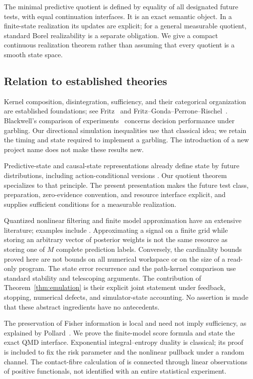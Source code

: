 The minimal predictive quotient is defined by equality of all designated
future tests, with equal continuation interfaces. It is an exact semantic
object. In a finite-state realization its updates are explicit; for a
general measurable quotient, standard Borel realizability is a separate
obligation. We give a compact continuous realization theorem rather than
assuming that every quotient is a smooth state space.

\subsection{Relation to established theories}
Kernel composition, disintegration, sufficiency, and their categorical
organization are established foundations; see Fritz~\cite{Fritz2020} and
Fritz--Gonda--Perrone--Rischel~\cite{FGPR2023}. Blackwell's comparison
of experiments~\cite{Blackwell1953} concerns decision performance under
garbling. Our directional simulation inequalities use that classical idea;
we retain the timing and state required to implement a garbling.
The introduction of a new project name does not make these results new.

Predictive-state and causal-state representations already define state by
future distributions, including action-conditional versions
\cite{ShaliziCrutchfield2001,LittmanSuttonSingh2002,BarnettCrutchfield2015}.
Our quotient theorem specializes to that principle. The present presentation
makes the future test class, preparation, zero-evidence convention, and
resource interface explicit, and supplies sufficient conditions for a
measurable realization.

Quantized nonlinear filtering and finite model approximation have an
extensive literature; examples include
\cite{PagesPham2005,KalogeriasPetropulu2016,SaldiYukselLinder2017}.
Approximating a signal on a finite grid while storing an arbitrary vector of
posterior weights is not the same resource as storing one of $M$ complete
prediction labels. Conversely, the cardinality bounds proved here are not
bounds on all numerical workspace or on the size of a read-only program.
The state error recurrence and the path-kernel comparison use standard
stability and telescoping arguments. The contribution of
Theorem~\ref{thm:emulation} is their explicit joint statement under feedback,
stopping, numerical defects, and simulator-state accounting. No assertion is
made that these abstract ingredients have no antecedents.

The preservation of Fisher information is local and need not imply
sufficiency, as explained by Pollard~\cite{Pollard2013}. We prove the
finite-model score formula and state the exact QMD interface. Exponential
integral--entropy duality is classical; its proof is included to fix the
risk parameter and the nonlinear pullback under a random channel.
The contact-fibre calculation of \cite{QiA2} is connected through linear
observations of positive functionals, not identified with an entire
statistical experiment.

